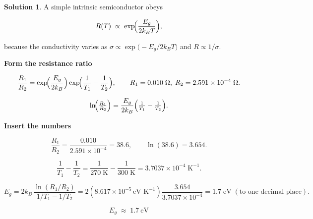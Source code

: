 \documentclass[12pt]{article}
\theoremstyle{definition} %
\newtheorem{solution}{Solution}
\theoremstyle{plain} %
\begin{document}
                \begin{solution}
                  A simple intrinsic semiconductor obeys  
                  
                  \[
                  R(T)\;\propto\; \exp\!\Bigl(\frac{E_g}{2k_B T}\Bigr),
                  \]
                  
                  because the conductivity varies as 
                  \(\sigma\propto\exp\!\bigl(-E_g/2k_B T\bigr)\) and  
                  \(R\propto 1/\sigma\).
                  
                  \vspace{0.4em}
                  \textbf{Form the resistance ratio}
                  
                  \[
                  \frac{R_1}{R_2}
                     = \exp\!\Bigl(\frac{E_g}{2k_B}\Bigr)
                       \exp\!\Bigl(\frac{1}{T_1}-\frac{1}{T_2}\Bigr),
                  \qquad
                  R_1 = 0.010\;\Omega,\;
                  R_2 = 2.591\times10^{-4}\;\Omega.
                  \]
                  
                  \[
                  \ln\!\Bigl(\tfrac{R_1}{R_2}\Bigr)
                    = \frac{E_g}{2k_B}\Bigl(\tfrac{1}{T_1}-\tfrac{1}{T_2}\Bigr).
                  \]
                  
                  \vspace{0.4em}
                  \textbf{Insert the numbers}
                  
                  \[
                  \frac{R_1}{R_2} = \frac{0.010}{2.591\times10^{-4}} = 38.6,
                  \qquad
                  \ln(38.6)=3.654.
                  \]
                  
                  \[
                  \frac{1}{T_1}-\frac{1}{T_2}
                     = \frac{1}{270\;\text{K}}-\frac{1}{300\;\text{K}}
                     = 3.7037\times10^{-4}\;\text{K}^{-1}.
                  \]
                  
                  \[
                  E_g
                    = 2k_B\,\frac{\ln(R_1/R_2)}{1/T_1-1/T_2}
                    = 2(8.617\times10^{-5}\,\text{eV K}^{-1})
                      \frac{3.654}{3.7037\times10^{-4}}
                    = 1.7\;\text{eV}\;(\text{to one decimal place}).
                  \]
                  
                  \[
                  \boxed{E_g \;\approx\; 1.7\ \text{eV}}
                  \]
                  \end{solution}
\end{document}
